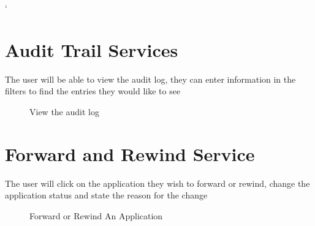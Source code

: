 \documentclass[12pt]{article}
\begin{document}
`\section{Audit Trail Services}
The user will be able to view the audit log, they can enter information in the filters to find the entries they would like to see
\begin{figure}[H]
\centering	
{}
\caption{View the audit log}
\end{figure}

\newpage
\section{Forward and Rewind Service}

The user will click on the application they wish to forward or rewind, change the application status and state the reason for the change
\begin{figure}[H]
\centering	
{}
\caption{Forward or Rewind An Application}
\end{figure}
\end{document}
